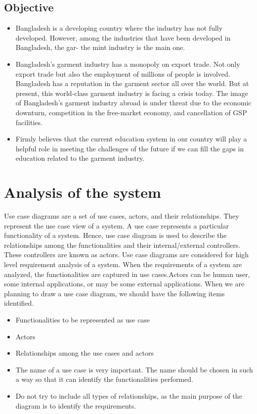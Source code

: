 \documentclass{article}
\begin{document}
\subsection{Objective}
\begin{itemize}
    \item  Bangladesh is a developing country where the industry has not fully developed.
However, among the industries that have been developed in Bangladesh, the gar-
the mint industry is the main one.
\item Bangladesh’s garment industry has a monopoly
on export trade. Not only export trade but also the employment of millions of people is involved. Bangladesh has a reputation in the garment sector all over the
world. But at present, this world-class garment industry is facing a crisis today.
The image of Bangladesh’s garment industry abroad is under threat due to the
economic downturn, competition in the free-market economy, and cancellation
of GSP facilities.
\item Firmly believes that the current education system in our country will play a helpful role in meeting
the challenges of the future if we can fill the gaps in education related to the
garment industry.
\end{itemize}

\newpage
\section{Analysis of the system}
Use case diagrams are a set of use cases, actors, and their relationships. They represent the
use case view of a system.
A use case represents a particular functionality of a system. Hence, use case diagram is used
to describe the relationships among the functionalities and their internal/external controllers.
These controllers are known as actors.
Use case diagrams are considered for high level requirement analysis of a system. When the
requirements of a system are analyzed, the functionalities are captured in use cases.Actors can
be human user, some internal applications, or may be some external applications. When we
are planning to draw a use case diagram, we should have the following items identified.
\begin{itemize}
    \item Functionalities to be represented as use case
\item Actors
\item Relationships among the use cases and actors
\item The name of a use case is very important. The name should be chosen in such a way so
that it can identify the functionalities performed.
\item Do not try to include all types of relationships, as the main purpose of the diagram is to
identify the requirements.
\end{itemize}
\newpage
\end{document}
